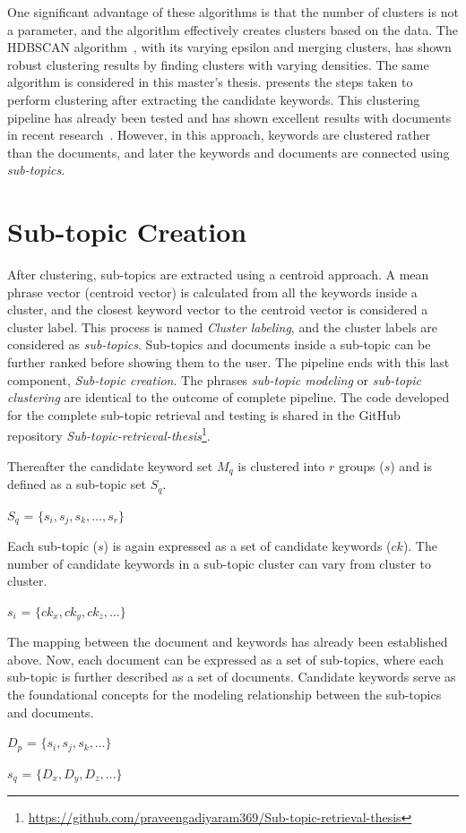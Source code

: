 One significant advantage of these algorithms is that the number of clusters is not a parameter, and the algorithm effectively creates clusters based on the data. The \ac{HDBSCAN} algorithm~\cite{mcinnes2017hdbscan}, with its varying epsilon and merging clusters, has shown robust clustering results by finding clusters with varying densities. The same algorithm is considered in this master's thesis.  presents the steps taken to perform clustering after extracting the candidate keywords. This clustering pipeline has already been tested and has shown excellent results with documents in recent research~\cite{angelov2020top2vec}. However, in this approach, keywords are clustered rather than the documents, and later the keywords and documents are connected using \emph{sub-topics.}




\section{Sub-topic Creation} 

After clustering, sub-topics are extracted using a centroid approach. A mean phrase vector (centroid vector) is calculated from all the keywords inside a cluster, and the closest keyword vector to the centroid vector is considered a cluster label. This process is named \emph{Cluster labeling}, and the cluster labels are considered as \emph{sub-topics}. Sub-topics and documents inside a sub-topic can be further ranked before showing them to the user. The pipeline ends with this last component, \emph{Sub-topic creation}.  The phrases \emph{sub-topic modeling} or \emph{sub-topic clustering} are identical to the outcome of complete pipeline. The code developed for the complete sub-topic retrieval and testing is shared in the GitHub repository \emph{Sub-topic-retrieval-thesis}\footnote{\url{https://github.com/praveengadiyaram369/Sub-topic-retrieval-thesis}}.


Thereafter the candidate keyword set $M_q$ is clustered into $r$ groups ($s$) and is defined as a sub-topic set $S_q$. 

\centerline{$S_q$ = $\{s_i, s_j, s_k,\dots, s_r\}$}

Each sub-topic ($s$) is again expressed as a set of candidate keywords  ($ck$). The number of candidate keywords in a sub-topic cluster can vary from cluster to cluster.

\centerline{$s_i$ = $\{ck_x, ck_y, ck_z,\dots\}$}

The mapping between the document and keywords has already been established above. Now, each document can be expressed as a set of sub-topics, where each sub-topic is further described as a set of documents. Candidate keywords serve as the foundational concepts for the modeling relationship between the sub-topics and documents.

\centerline{$D_p$ = $\{s_i, s_j, s_k,\dots\}$ }
\centerline{$s_q$ = $\{D_x, D_y, D_z,\dots\}$}


